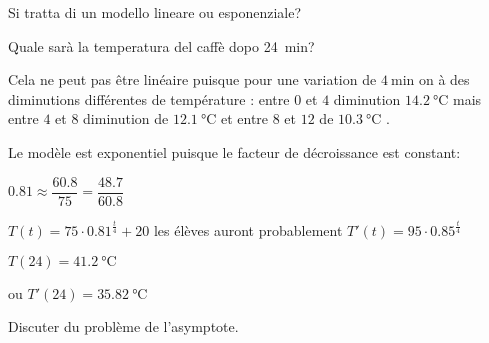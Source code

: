 \begin{questions}
{Si tratta di un modello lineare ou esponenziale?

Quale sarà la temperatura del caffè dopo \SI{24}{\minute}?
}

\begin{profonly}
Cela ne peut pas être linéaire puisque pour une variation de  $\SI{4}{\minute}$ on à des diminutions différentes de température : entre $0$ et $4$ diminution $\SI{14.2}{\degreeCelsius}$ mais entre $4$ et $8$ diminution de $\SI{12.1}{\degreeCelsius}$  et entre $8$ et $12$ de $\SI{10.3}{\degreeCelsius}$ .

Le modèle est exponentiel puisque le facteur de décroissance est constant:

$0.81 \approx \dfrac{60.8}{75}=\dfrac{48.7}{60.8}$

$T(t)= 75 \cdot 0.81^\frac{t}{4}+20$  les élèves auront probablement $T'(t)=95 \cdot 0.85^\frac{t}{4}$

$T(24)=\SI{41.2}{\degreeCelsius}$ 

ou $T'(24)=\SI{35.82}{\degreeCelsius}$ 

Discuter du problème de l'asymptote.
\end{profonly}

\exnewpage
\question 
{}



\question
{}
\end{questions}
